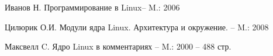 \newpage
\section*{}

\begin{thebibliography}{00}

Иванов Н. Программирование в Linux-- M.: 2006

Цилюрик О.И. Модули ядра Linux. Архитектура и окружение. -- M.: 2008

Максвелл C. Ядро Linux в комментариях -- M.: 2000 -- 488 стр.


\end{thebibliography}